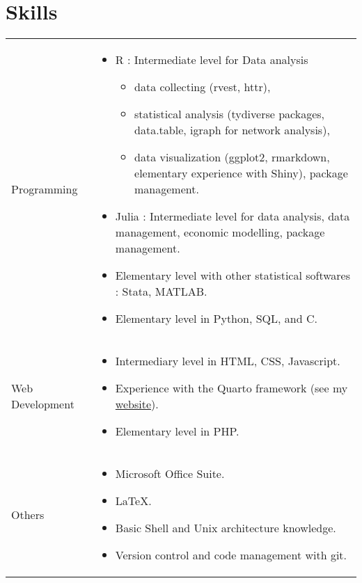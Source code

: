 \documentclass[a4paper,12pt]{article}
\begin{document}
\section{Skills}
\begin{tabularx}{\linewidth}{@{}l X@{}}
    Programming & \begin{itemize}
        \item R : Intermediate level for Data analysis
        \begin{itemize}
            \item data collecting (rvest, httr), 
            \item statistical analysis (tydiverse packages, data.table, igraph for network analysis), 
            \item data visualization (ggplot2, rmarkdown, elementary experience with Shiny), package management.
        \end{itemize}
        \item Julia : Intermediate level for data analysis, data management, economic modelling, package management.
        \item Elementary level with other statistical softwares : Stata, MATLAB.
        \item Elementary level in Python, SQL, and C.
    \end{itemize} \\

    Web Development  &  
    \begin{itemize}
        \item Intermediary level in HTML, CSS, Javascript.
        \item Experience with the Quarto framework (see my \href{https://www.paulogcd.com}{website}).
        \item Elementary level in PHP.
    \end{itemize} \\

    Others \quad \quad \quad \quad \quad \quad &
    \begin{itemize}
        \item Microsoft Office Suite.
        \item \LaTeX.
        \item Basic Shell and Unix architecture knowledge.
        \item Version control and code management with git.
    \end{itemize}
\end{tabularx}
\end{document}
